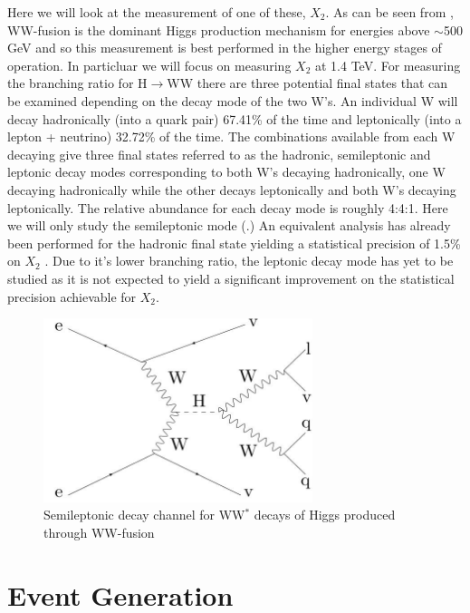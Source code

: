 Here we will look at the measurement of one of these, $X_2$. As can be seen from , WW-fusion is the dominant Higgs production mechanism for energies above $\sim $500 GeV and so this measurement is best performed in the higher energy stages of operation. In particluar we will focus on measuring $X_2$ at 1.4 TeV. For measuring the branching ratio for H$\rightarrow$WW there are three potential final states that can be examined depending on the decay mode of the two W's. An individual W will decay hadronically (into a quark pair) 67.41\% of the time and leptonically (into a lepton + neutrino) 32.72\% of the time.  The combinations available from each W decaying give three final states referred to as the hadronic, semileptonic and leptonic decay modes corresponding to both W's decaying hadronically, one W decaying hadronically while the other decays leptonically and both W's decaying leptonically. The relative abundance for each decay mode is roughly 4:4:1. Here we will only study the semileptonic mode (.) An equivalent analysis has already been performed for the hadronic final state yielding a statistical precision of 1.5\% on $X_2$ \cite{Abramowicz:2016zbo}. Due to it's lower branching ratio, the leptonic decay mode has yet to be studied as it is not expected to yield a significant improvement on the statistical precision achievable for $X_2$. 

\begin{figure}
  \centering
  \includegraphics[width=0.7\textwidth,keepaspectratio]{Experiments/fig/feynmann}
  \caption[Semileptonic decay channel for  WW$^*$ decays of Higgs produced through WW-fusion]{Semileptonic decay channel for  WW$^*$ decays of Higgs produced through WW-fusion}
  \label{fig:semileptonic}
\end{figure}

\section{Event Generation}

